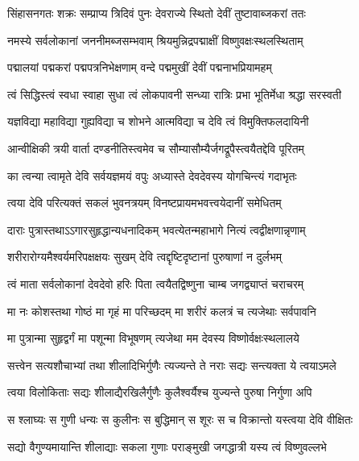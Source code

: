 

\twolineshloka
{सिंहासनगतः शक्रः सम्प्राप्य त्रिदिवं पुनः}
{देवराज्ये स्थितो देवीं तुष्टावाब्जकरां ततः}

\twolineshloka
{नमस्ये सर्वलोकानां जननीमब्जसम्भवाम्}
{श्रियमुन्निद्रपद्माक्षीं विष्णुवक्षःस्थलस्थिताम्}

\twolineshloka
{पद्मालयां पद्मकरां पद्मपत्रनिभेक्षणाम्}
{वन्दे पद्ममुखीं देवीं पद्मनाभप्रियामहम्}

\twolineshloka
{त्वं सिद्धिस्त्वं स्वधा स्वाहा सुधा त्वं लोकपावनी}
{सन्ध्या रात्रिः प्रभा भूतिर्मेधा श्रद्धा सरस्वती}

\twolineshloka
{यज्ञविद्या महाविद्या गुह्यविद्या च शोभने}
{आत्मविद्या च देवि त्वं विमुक्तिफलदायिनी}

\twolineshloka
{आन्वीक्षिकी त्रयी वार्ता दण्डनीतिस्त्वमेव च}
{सौम्यासौम्यैर्जगद्रूपैस्त्वयैतद्देवि पूरितम्}

\twolineshloka
{का त्वन्या त्वामृते देवि सर्वयज्ञमयं वपुः}
{अध्यास्ते देवदेवस्य योगचिन्त्यं गदाभृतः}

\twolineshloka
{त्वया देवि परित्यक्तं सकलं भुवनत्रयम्}
{विनष्टप्रायमभवत्त्वयेदानीं समेधितम्}

\twolineshloka
{दाराः पुत्रास्तथाऽऽगारसुहृद्धान्यधनादिकम्}
{भवत्येतन्महाभागे नित्यं त्वद्वीक्षणान्नृणाम्}

\twolineshloka
{शरीरारोग्यमैश्वर्यमरिपक्षक्षयः सुखम्}
{देवि त्वद्दृष्टिदृष्टानां पुरुषाणां न दुर्लभम्}

\twolineshloka
{त्वं माता सर्वलोकानां देवदेवो हरिः पिता}
{त्वयैतद्विष्णुना चाम्ब जगद्व्याप्तं चराचरम्}

\twolineshloka
{मा नः कोशस्तथा गोष्ठं मा गृहं मा परिच्छदम्}
{मा शरीरं कलत्रं च त्यजेथाः सर्वपावनि}

\twolineshloka
{मा पुत्रान्मा सुहृद्वर्गं मा पशून्मा विभूषणम्}
{त्यजेथा मम देवस्य विष्णोर्वक्षःस्थलालये}

\twolineshloka
{सत्त्वेन सत्यशौचाभ्यां तथा शीलादिभिर्गुणैः}
{त्यज्यन्ते ते नराः सद्यः सन्त्यक्ता ये त्वयाऽमले}

\twolineshloka
{त्वया विलोकिताः सद्यः शीलाद्यैरखिलैर्गुणैः}
{कुलैश्वर्यैश्च युज्यन्ते पुरुषा निर्गुणा अपि}

\twolineshloka
{स श्लाघ्यः स गुणी धन्यः स कुलीनः स बुद्धिमान्}
{स शूरः स च विक्रान्तो यस्त्वया देवि वीक्षितः}

\twolineshloka
{सद्यो वैगुण्यमायान्ति शीलाद्याः सकला गुणाः}
{पराङ्मुखी जगद्धात्री यस्य त्वं विष्णुवल्लभे}

